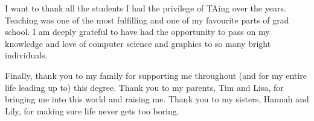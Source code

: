 I want to thank all the students I had the privilege of TAing over the years.
Teaching was one of the most fulfilling and one of my favourite parts of grad school.
I am deeply grateful to have had the opportunity to pass on my knowledge and love of computer science and graphics to so many bright individuals.


Finally, thank you to my family for supporting me throughout (and for my entire life leading up to) this degree.
Thank you to my parents, Tim and Lisa, for bringing me into this world and raising me.
Thank you to my sisters, Hannah and Lily, for making sure life never gets too boring.


\begin{singlespace}
\newpage
{}
\tableofcontents
\pagestyle{plain}
\newpage
{}
\listoftables
\pagestyle{plain}
\newpage
{}
\listoffigures
\pagestyle{plain}
\clearpage
\clearpage          %
\end{singlespace}
